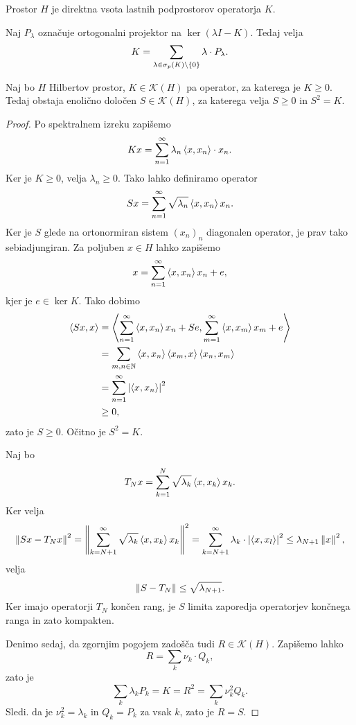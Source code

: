 \begin{opomba}
Prostor $H$ je direktna vsota lastnih podprostorov operatorja $K$.
\end{opomba}

\begin{opomba}
Naj $P_\lambda$ označuje ortogonalni projektor na
$\ker (\lambda I - K)$. Tedaj velja
\[
K =
\sum_{\lambda \in \sigma_p(K) \setminus \left\{0\right\}}
\lambda \cdot P_\lambda.
\]
\end{opomba}


\begin{trditev}
Naj bo $H$ Hilbertov prostor, $K \in \mathcal{K}(H)$ pa operator,
za katerega je $K \geq 0$. Tedaj obstaja enolično določen
$S \in \mathcal{K}(H)$, za katerega velja $S \geq 0$ in $S^2 = K$.
\end{trditev}

\begin{proof}
Po spektralnem izreku zapišemo
\[
K x = \sum_{n=1}^\infty \lambda_n \left\langle x, x_n\right\rangle \cdot x_n.
\]
Ker je $K \geq 0$, velja $\lambda_n \geq 0$. Tako lahko definiramo
operator
\[
S x = \sum_{n=1}^\infty \sqrt{\lambda_n} \left\langle x, x_n\right\rangle x_n.
\]
Ker je $S$ glede na ortonormiran sistem $(x_n)_n$ diagonalen
operator, je prav tako sebiadjungiran. Za poljuben $x \in H$ lahko
zapišemo
\[
x = \sum_{n=1}^\infty \left\langle x, x_n\right\rangle x_n + e,
\]
kjer je $e \in \ker K$. Tako dobimo
\begin{align*}
\left\langle Sx, x\right\rangle &=
\left\langle \sum_{n=1}^\infty \left\langle x, x_n\right\rangle x_n + Se,
\sum_{m=1}^\infty \left\langle x, x_m\right\rangle x_m + e\right\rangle
\\
&=
\sum_{m, n \in \mathbb{N}} \left\langle x, x_n\right\rangle \left\langle x_m, x\right\rangle \left\langle x_n, x_m\right\rangle
\\
&=
\sum_{n=1}^\infty \left\lvert \left\langle x, x_n\right\rangle\right\rvert^2
\\
&\geq
0,
\end{align*}
zato je $S \geq 0$. Očitno je $S^2 = K$.

Naj bo
\[
T_N x = \sum_{k=1}^N \sqrt{\lambda_k} \left\langle x, x_k\right\rangle x_k.
\]
Ker velja
\[
\left\lVert Sx - T_N x\right\rVert^2 =
\left\lVert \sum_{k=N+1}^\infty \sqrt{\lambda_k} \left\langle x, x_k\right\rangle x_k\right\rVert^2 =
\sum_{k=N+1}^\infty \lambda_k \cdot \left\lvert \left\langle x, x_l\right\rangle\right\rvert^2 \leq
\lambda_{N+1} \left\lVert x\right\rVert^2,
\]
velja
\[
\left\lVert S - T_N\right\rVert \leq \sqrt{\lambda_{N+1}}.
\]
Ker imajo operatorji $T_N$ končen rang, je $S$ limita zaporedja
operatorjev končnega ranga in zato kompakten.

Denimo sedaj, da zgornjim pogojem zadošča tudi
$R \in \mathcal{K}(H)$. Zapišemo lahko
\[
R = \sum_{k} \nu_k \cdot Q_k,
\]
zato je
\[
\sum_{k} \lambda_k P_k =
K =
R^2 =
\sum_k \nu_k^2 Q_k.
\]
Sledi. da je $\nu_k^2 = \lambda_k$ in $Q_k = P_k$ za vsak $k$, zato
je $R = S$.
\end{proof}

